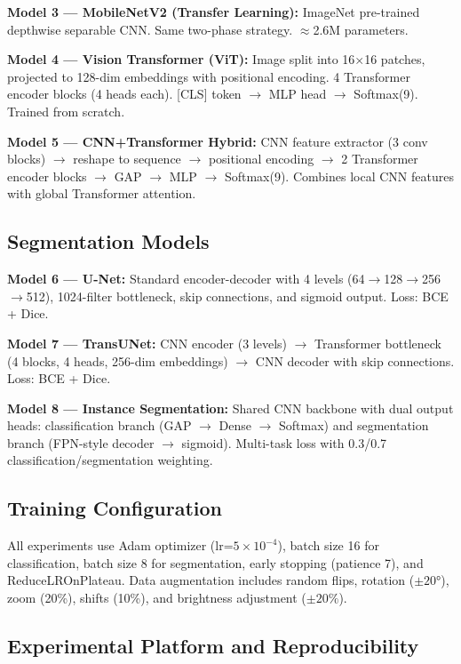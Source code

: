 \documentclass[10pt,twocolumn]{article}
\begin{document}
\textbf{Model 3 --- MobileNetV2 (Transfer Learning):} ImageNet pre-trained depthwise separable CNN. Same two-phase strategy. $\approx$2.6M parameters.

\textbf{Model 4 --- Vision Transformer (ViT):} Image split into 16$\times$16 patches, projected to 128-dim embeddings with positional encoding. 4 Transformer encoder blocks (4 heads each). [CLS] token $\rightarrow$ MLP head $\rightarrow$ Softmax(9). Trained from scratch.

\textbf{Model 5 --- CNN+Transformer Hybrid:} CNN feature extractor (3 conv blocks) $\rightarrow$ reshape to sequence $\rightarrow$ positional encoding $\rightarrow$ 2 Transformer encoder blocks $\rightarrow$ GAP $\rightarrow$ MLP $\rightarrow$ Softmax(9). Combines local CNN features with global Transformer attention.

\subsection{Segmentation Models}

\textbf{Model 6 --- U-Net:} Standard encoder-decoder with 4 levels (64$\rightarrow$128$\rightarrow$256$\rightarrow$512), 1024-filter bottleneck, skip connections, and sigmoid output. Loss: BCE + Dice.

\textbf{Model 7 --- TransUNet:} CNN encoder (3 levels) $\rightarrow$ Transformer bottleneck (4 blocks, 4 heads, 256-dim embeddings) $\rightarrow$ CNN decoder with skip connections. Loss: BCE + Dice.

\textbf{Model 8 --- Instance Segmentation:} Shared CNN backbone with dual output heads: classification branch (GAP $\rightarrow$ Dense $\rightarrow$ Softmax) and segmentation branch (FPN-style decoder $\rightarrow$ sigmoid). Multi-task loss with 0.3/0.7 classification/segmentation weighting.

\subsection{Training Configuration}

All experiments use Adam optimizer (lr=$5 \times 10^{-4}$), batch size 16 for classification, batch size 8 for segmentation, early stopping (patience 7), and ReduceLROnPlateau. Data augmentation includes random flips, rotation ($\pm 20°$), zoom (20\%), shifts (10\%), and brightness adjustment ($\pm 20\%$).

\subsection{Experimental Platform and Reproducibility}
\end{document}
